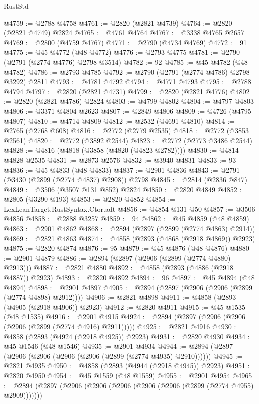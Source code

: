 \begin{lexlean}{RustStd}
\begin{coremodule}
@4759 := @2788 @4758
@4761 := @2820 (@2821 @4739)
@4764 := @2820 (@2821 @4749) @2824
@4765 := @4761 @4764
@4767 := @3338 @4765 @2657
@4769 := @2800 (@4759 @4767)
@4771 := @2790 (@4734 @4769)
@4772 := 91
@4775 := @45 @4772 (@48 @4772)
@4776 := @2793 @4775
@4781 := @2790 (@2791 (@2774 @4776) @2798 @3514)
@4782 := 92
@4785 := @45 @4782 (@48 @4782)
@4786 := @2793 @4785
@4792 := @2790 (@2791 (@2774 @4786) @2798 @3292) @2811
@4793 := @4781 @4792
@4794 := @4771 @4793
@4795 := @2788 @4794
@4797 := @2820 (@2821 @4731)
@4799 := @2820 (@2821 @4776)
@4802 := @2820 (@2821 @4786) @2824
@4803 := @4799 @4802
@4804 := @4797 @4803
@4806 := @3371 @4804 @2623
@4807 := @2849 @4806
@4809 := @4726 (@4795 @4807)
@4810 := @4714 @4809
@4812 := @2532 (@4691 @4810)
@4814 := @2765 (@2768 @608)
@4816 := @2772 (@2779 @2535)
@4818 := @2772 (@3853 @2561)
@4820 := @2772 (@3892 @2544)
@4823 := @2772 (@2773 @3486 @2544)
@4828 := @4816 (@4818 (@3858 (@4820 (@4823 @2782))))
@4830 := @4814 @4828 @2535
@4831 := @2873 @2576
@4832 := @3940 @4831
@4833 := 93
@4836 := @45 @4833 (@48 @4833)
@4837 := @2901 @4836
@4843 := @2791 (@3430 (@2899 (@2774 @4837) @2908)) @2798
@4845 := @2814 (@2836 @847)
@4849 := @3506 (@3507 @131 @852) @2824
@4850 := @2820 @4849
@4852 := @2805 (@3290 @193)
@4853 := @2820 @4852
@4854 := LexLeanTarget.RustSyntax.Ctor.adt
@4856 := @4854 @131 @50
@4857 := @3506 @4856
@4858 := @2888 @3257
@4859 := 94
@4862 := @45 @4859 (@48 @4859)
@4863 := @2901 @4862
@4868 := @2894 (@2897 (@2899 (@2774 @4863) @2914))
@4869 := @2821 @4863
@4874 := @4858 (@2893 (@4868 (@2918 @4869)) @2923)
@4875 := @2820 @4874
@4876 := 95
@4879 := @45 @4876 (@48 @4876)
@4880 := @2901 @4879
@4886 := @2894 (@2897 (@2906 (@2899 (@2774 @4880) @2913)))
@4887 := @2821 @4880
@4892 := @4858 (@2893 (@4886 (@2918 @4887)) @2923)
@4893 := @2820 @4892
@4894 := 96
@4897 := @45 @4894 (@48 @4894)
@4898 := @2901 @4897
@4905 := @2894 (@2897 (@2906 (@2906 (@2899 (@2774 @4898) @2912))))
@4906 := @2821 @4898
@4911 := @4858 (@2893 (@4905 (@2918 @4906)) @2923)
@4912 := @2820 @4911
@4915 := @45 @1535 (@48 @1535)
@4916 := @2901 @4915
@4924 := @2894 (@2897 (@2906 (@2906 (@2906 (@2899 (@2774 @4916) @2911)))))
@4925 := @2821 @4916
@4930 := @4858 (@2893 (@4924 (@2918 @4925)) @2923)
@4931 := @2820 @4930
@4934 := @45 @1546 (@48 @1546)
@4935 := @2901 @4934
@4944 := @2894 (@2897 (@2906 (@2906 (@2906 (@2906 (@2899 (@2774 @4935) @2910))))))
@4945 := @2821 @4935
@4950 := @4858 (@2893 (@4944 (@2918 @4945)) @2923)
@4951 := @2820 @4950
@4954 := @45 @1559 (@48 @1559)
@4955 := @2901 @4954
@4965 := @2894 (@2897 (@2906 (@2906 (@2906 (@2906 (@2906 (@2899 (@2774 @4955) @2909)))))))

\end{coremodule}
\end{lexlean}
